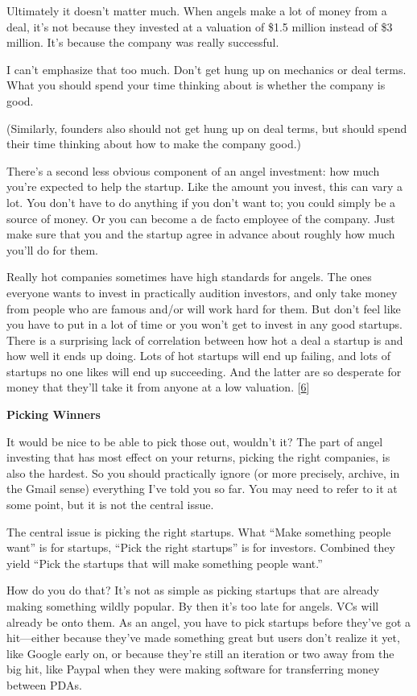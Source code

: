 Ultimately it doesn't matter much. When angels make a lot of money from
a deal, it's not because they invested at a valuation of \$1.5 million
instead of \$3 million. It's because the company was really successful.

I can't emphasize that too much. Don't get hung up on mechanics or deal
terms. What you should spend your time thinking about is whether the
company is good.

(Similarly, founders also should not get hung up on deal terms, but
should spend their time thinking about how to make the company good.)

There's a second less obvious component of an angel investment: how much
you're expected to help the startup. Like the amount you invest, this
can vary a lot. You don't have to do anything if you don't want to; you
could simply be a source of money. Or you can become a de facto employee
of the company. Just make sure that you and the startup agree in advance
about roughly how much you'll do for them.

Really hot companies sometimes have high standards for angels. The ones
everyone wants to invest in practically audition investors, and only
take money from people who are famous and/or will work hard for them.
But don't feel like you have to put in a lot of time or you won't get to
invest in any good startups. There is a surprising lack of correlation
between how hot a deal a startup is and how well it ends up doing. Lots
of hot startups will end up failing, and lots of startups no one likes
will end up succeeding. And the latter are so desperate for money that
they'll take it from anyone at a low valuation. {[}\hyperref[f6n]{6}{]}

\textbf{Picking Winners}

It would be nice to be able to pick those out, wouldn't it? The part of
angel investing that has most effect on your returns, picking the right
companies, is also the hardest. So you should practically ignore (or
more precisely, archive, in the Gmail sense) everything I've told you so
far. You may need to refer to it at some point, but it is not the
central issue.

The central issue is picking the right startups. What ``Make something
people want'' is for startups, ``Pick the right startups'' is for
investors. Combined they yield ``Pick the startups that will make
something people want.''

How do you do that? It's not as simple as picking startups that are
already making something wildly popular. By then it's too late for
angels. VCs will already be onto them. As an angel, you have to pick
startups before they've got a hit---either because they've made
something great but users don't realize it yet, like Google early on, or
because they're still an iteration or two away from the big hit, like
Paypal when they were making software for transferring money between
PDAs.

